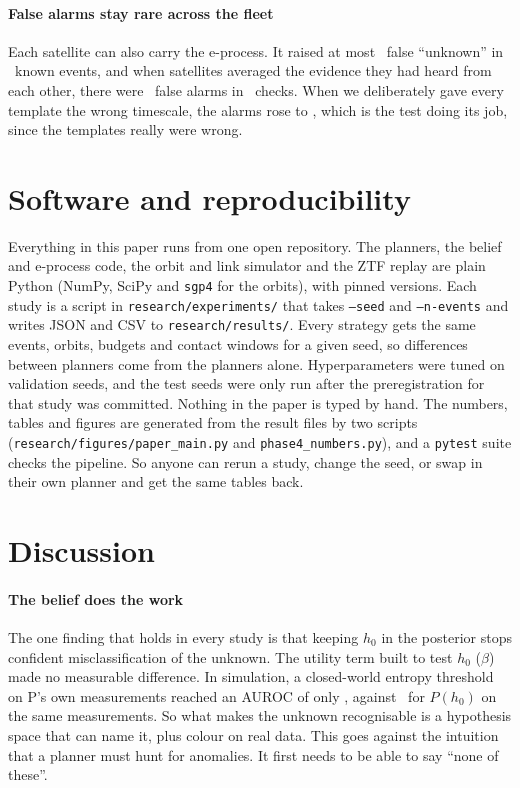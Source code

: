 \documentclass[final,5p,times,twocolumn,authoryear]{elsarticle}
\begin{document}
\paragraph{False alarms stay rare across the fleet} Each satellite can also carry the e-process. It raised at most \FleetHEOneMaxK\ false ``unknown'' in \FleetHEOneN\ known events, and when satellites averaged the evidence they had heard from each other, there were \FleetHETwoK\ false alarms in \FleetHETwoN\ checks. When we deliberately gave every template the wrong timescale, the alarms rose to \FleetMEFalseUnknownO, which is the test doing its job, since the templates really were wrong.

\section{Software and reproducibility}\label{sec:software}
Everything in this paper runs from one open repository. The planners, the belief and e-process code, the orbit and link simulator and the ZTF replay are plain Python (NumPy, SciPy and \texttt{sgp4} for the orbits), with pinned versions. Each study is a script in \texttt{research/experiments/} that takes \texttt{--seed} and \texttt{--n-events} and writes JSON and CSV to \texttt{research/results/}. Every strategy gets the same events, orbits, budgets and contact windows for a given seed, so differences between planners come from the planners alone. Hyperparameters were tuned on validation seeds, and the test seeds were only run after the preregistration for that study was committed. Nothing in the paper is typed by hand. The numbers, tables and figures are generated from the result files by two scripts (\texttt{research/figures/paper\_main.py} and \texttt{phase4\_numbers.py}), and a \texttt{pytest} suite checks the pipeline. So anyone can rerun a study, change the seed, or swap in their own planner and get the same tables back.

\section{Discussion}\label{sec:disc}

\paragraph{The belief does the work} The one finding that holds in every study is that keeping $h_0$ in the posterior stops confident misclassification of the unknown. The utility term built to test $h_0$ ($\beta$) made no measurable difference. In simulation, a closed-world entropy threshold on P's own measurements reached an AUROC of only \SimAucPown, against \SimAucP\ for $P(h_0)$ on the same measurements. So what makes the unknown recognisable is a hypothesis space that can name it, plus colour on real data. This goes against the intuition that a planner must hunt for anomalies. It first needs to be able to say ``none of these''.
\end{document}

